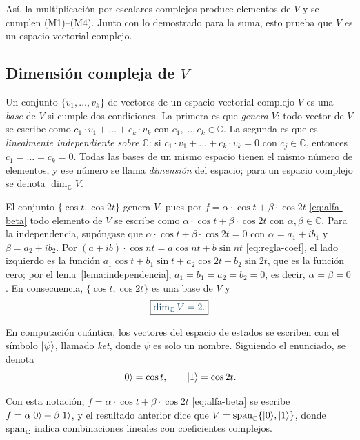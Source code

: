 \medskip
Así, la multiplicación por escalares complejos produce elementos de $V$ y se cumplen (M1)--(M4). Junto
con lo demostrado para la suma, esto prueba que $V$ es un espacio vectorial complejo.

\subsection*{Dimensión compleja de $V$}

\begin{definicionT}
Un conjunto $\{v_1,\dots,v_k\}$ de vectores de un espacio vectorial complejo $V$ es una
\emph{base} de $V$ si cumple dos condiciones. La primera es que \emph{genera} $V$: todo
vector de $V$ se escribe como $c_1\cdot v_1+\dots+c_k\cdot v_k$ con $c_1,\dots,c_k\in\mathbb C$.
La segunda es que es \emph{linealmente independiente sobre $\mathbb C$}: si
$c_1\cdot v_1+\dots+c_k\cdot v_k=0$ con $c_j\in\mathbb C$, entonces $c_1=\dots=c_k=0$. Todas
las bases de un mismo espacio tienen el mismo número de elementos, y ese número se llama
\emph{dimensión} del espacio; para un espacio complejo se denota $\dim_{\mathbb C}V$.
\end{definicionT}

El conjunto $\{\cos t,\cos 2t\}$ genera $V$, pues por $f=\alpha\cdot\cos t+\beta\cdot\cos 2t$ \eqref{eq:alfa-beta} todo elemento de $V$
se escribe como $\alpha\cdot\cos t+\beta\cdot\cos 2t$ con $\alpha,\beta\in\mathbb C$. Para la
independencia, supóngase que $\alpha\cdot\cos t+\beta\cdot\cos 2t=0$ con
$\alpha=a_1+ib_1$ y $\beta=a_2+ib_2$. Por $(a+ib)\cdot\cos nt=a\cos nt+b\sin nt$ \eqref{eq:regla-coef}, el lado izquierdo es la función
$a_1\cos t+b_1\sin t+a_2\cos 2t+b_2\sin 2t$, que es la función cero; por el
lema~\ref{lema:independencia}, $a_1=b_1=a_2=b_2=0$, es decir, $\alpha=\beta=0$. En
consecuencia, $\{\cos t,\cos 2t\}$ es una base de $V$ y
\[
  \destacado{\dim_{\mathbb C}V=2 .}
\]

\begin{definicionT}
En computación cuántica, los vectores del espacio de estados se escriben con el símbolo
$\lvert \psi\rangle$, llamado \emph{ket}, donde $\psi$ es solo un nombre. Siguiendo el enunciado, se
denota
\[
  \lvert 0\rangle=\cos t,\qquad \lvert 1\rangle=\cos 2t .
\]
\end{definicionT}

Con esta notación, $f=\alpha\cdot\cos t+\beta\cdot\cos 2t$ \eqref{eq:alfa-beta} se escribe $f=\alpha\lvert 0\rangle+\beta\lvert 1\rangle$, y el resultado
anterior dice que $V=\operatorname{span}_{\mathbb C}\{\lvert 0\rangle,\lvert 1\rangle\}$, donde $\operatorname{span}_{\mathbb C}$ indica combinaciones lineales con
coeficientes complejos.


